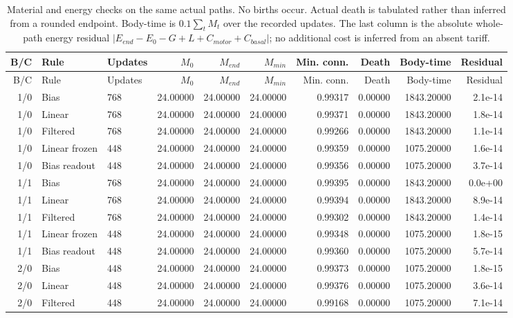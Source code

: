 \begin{longtable}{rllrrrrrrr}
\caption{Material and energy checks on the same actual paths. No births occur. Actual death is tabulated rather than inferred from a rounded endpoint. Body-time is $0.1\sum_t M_t$ over the recorded updates. The last column is the absolute whole-path energy residual $|E_{end}-E_0-G+L+C_{motor}+C_{basal}|$; no additional cost is inferred from an absent tariff.}\label{tab:gain-material}\\
\toprule
B/C & Rule & Updates & $M_0$ & $M_{end}$ & $M_{min}$ & Min. conn. & Death & Body-time & Residual \\
\midrule
\endfirsthead
\toprule
B/C & Rule & Updates & $M_0$ & $M_{end}$ & $M_{min}$ & Min. conn. & Death & Body-time & Residual \\
\midrule
\endhead
1/0 & Bias & 768 & 24.00000 & 24.00000 & 24.00000 & 0.99317 & 0.00000 & 1843.20000 & 2.1e-14 \\
1/0 & Linear & 768 & 24.00000 & 24.00000 & 24.00000 & 0.99371 & 0.00000 & 1843.20000 & 1.8e-14 \\
1/0 & Filtered & 768 & 24.00000 & 24.00000 & 24.00000 & 0.99266 & 0.00000 & 1843.20000 & 1.1e-14 \\
1/0 & Linear frozen & 448 & 24.00000 & 24.00000 & 24.00000 & 0.99359 & 0.00000 & 1075.20000 & 1.6e-14 \\
1/0 & Bias readout & 448 & 24.00000 & 24.00000 & 24.00000 & 0.99356 & 0.00000 & 1075.20000 & 3.7e-14 \\
1/1 & Bias & 768 & 24.00000 & 24.00000 & 24.00000 & 0.99395 & 0.00000 & 1843.20000 & 0.0e+00 \\
1/1 & Linear & 768 & 24.00000 & 24.00000 & 24.00000 & 0.99394 & 0.00000 & 1843.20000 & 8.9e-14 \\
1/1 & Filtered & 768 & 24.00000 & 24.00000 & 24.00000 & 0.99302 & 0.00000 & 1843.20000 & 1.4e-14 \\
1/1 & Linear frozen & 448 & 24.00000 & 24.00000 & 24.00000 & 0.99348 & 0.00000 & 1075.20000 & 1.8e-15 \\
1/1 & Bias readout & 448 & 24.00000 & 24.00000 & 24.00000 & 0.99360 & 0.00000 & 1075.20000 & 5.7e-14 \\
2/0 & Bias & 448 & 24.00000 & 24.00000 & 24.00000 & 0.99373 & 0.00000 & 1075.20000 & 1.8e-15 \\
2/0 & Linear & 448 & 24.00000 & 24.00000 & 24.00000 & 0.99376 & 0.00000 & 1075.20000 & 3.6e-14 \\
2/0 & Filtered & 448 & 24.00000 & 24.00000 & 24.00000 & 0.99168 & 0.00000 & 1075.20000 & 7.1e-14 \\

\end{longtable}

